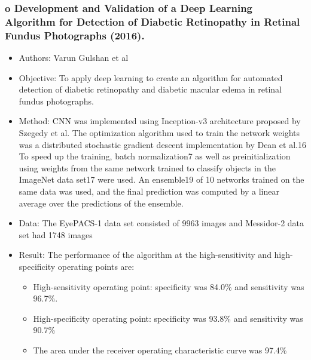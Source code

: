 \documentclass[12pt]{report}
\begin{document}
\subsubsection{o   Development and Validation of a Deep Learning Algorithm for Detection of Diabetic Retinopathy in Retinal Fundus Photographs (2016). \cite{gulshan2016development}}
\begin{itemize}
\item Authors: Varun Gulshan et al
\item Objective: To apply deep learning to create an algorithm for automated detection of diabetic retinopathy and diabetic macular edema in retinal fundus photographs.
\item Method: CNN was implemented using Inception-v3 architecture proposed by Szegedy et al. The optimization algorithm used to train the network weights was a distributed stochastic gradient descent implementation by Dean et al.16 To speed up the training, batch normalization7 as well as preinitialization using weights from the same network trained to classify objects in the ImageNet data set17 were used. An ensemble19 of 10 networks trained on the same data was used, and the final prediction was computed by a linear average over the predictions of the ensemble.
\item Data: The EyePACS-1 data set consisted of 9963 images and Messidor-2 data set had 1748 images
\item Result: The performance of the algorithm at the high-sensitivity and high-specificity operating points are:
\begin{itemize}
\item High-sensitivity operating point: specificity was 84.0\% and sensitivity was 96.7\%.
\item High-specificity operating point: specificity was 93.8\% and sensitivity was 90.7\%
\item The area under the receiver operating characteristic curve was 97.4\%
\end{itemize}
\end{itemize}
\end{document}
